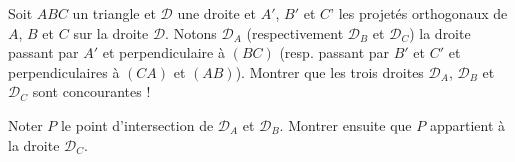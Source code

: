 \begin{exo}
Soit $ABC$ un triangle et $\mathcal D$ une droite et $A'$, $B'$ et $C$' les projetés orthogonaux de $A$, $B$ et $C$ sur la droite $\mathcal D$.
Notons $\mathcal D_A$ (respectivement $\mathcal D_B$ et $\mathcal D_C$) la droite passant par $A'$ et perpendiculaire à $(BC)$ (resp. passant par $B'$ et $C'$ et perpendiculaires à $(CA)$ et $(AB)$).
Montrer que les trois droites  $\mathcal D_A$, $\mathcal D_B$ et $\mathcal D_C$ sont concourantes !
\begin{hint}
Noter $P$ le point d'intersection de $\mathcal D_A$ et $\mathcal D_B$. Montrer ensuite que $P$ appartient à la droite $\mathcal D_C$.
\end{hint}
\begin{sol}
\end{sol}
\end{exo}

\begin{exo}
\begin{hint}
\end{hint}
\begin{sol}
\end{sol}
\end{exo}

\begin{exo}
\begin{hint}
\end{hint}
\begin{sol}
\end{sol}
\end{exo}

\begin{exo}
\begin{hint}
\end{hint}
\begin{sol}
\end{sol}
\end{exo}

\begin{exo}
\begin{hint}
\end{hint}
\begin{sol}
\end{sol}
\end{exo}

\begin{exo}
\begin{hint}
\end{hint}
\begin{sol}
\end{sol}
\end{exo}

